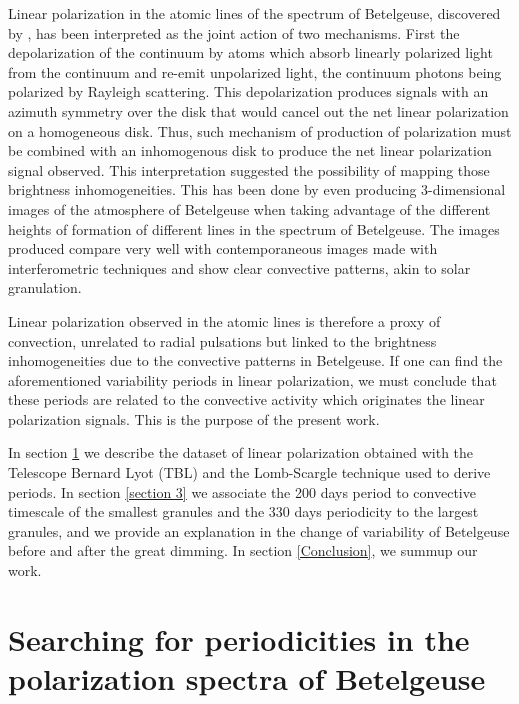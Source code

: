 \documentclass{aa}
\begin{document}
Linear polarization in the atomic lines of the spectrum of Betelgeuse, discovered by \cite{auriere_discovery_2016}, has been interpreted as the joint action of 
two mechanisms. First the depolarization of the continuum by atoms which absorb linearly polarized light from the continuum and re-emit unpolarized light, the 
continuum photons being polarized by Rayleigh scattering. This depolarization produces signals with an azimuth symmetry over the disk that 
would  cancel out the net linear polarization on a homogeneous disk. Thus, such mechanism of production of polarization must be combined with an inhomogenous disk to produce the net linear polarization 
signal observed. This interpretation suggested the possibility of mapping those brightness inhomogeneities. This has been done by \cite{lopez_ariste_convective_2018} 
even producing 3-dimensional images of the atmosphere of Betelgeuse \citep{lopez_ariste_three-dimensional_2022} when taking advantage of the different heights of formation of 
different lines in the spectrum of Betelgeuse. The images produced compare very well with contemporaneous images made with interferometric 
techniques \citep{montarges_close_2016} and show clear convective patterns, akin to solar granulation.

Linear polarization observed in the atomic lines is therefore a proxy of convection, unrelated to radial 
pulsations but linked to the brightness inhomogeneities due to the convective patterns in Betelgeuse. If one can find the 
aforementioned variability periods 
in linear polarization, we must conclude that these periods are related to the convective activity which originates the linear 
polarization signals.
This is the purpose of the present work. 

In section \ref{Section 2} we describe the dataset of linear polarization obtained with the Telescope Bernard Lyot (TBL) and the Lomb-Scargle technique used to derive periods. 
In section \ref{section 3} we associate the 200 days period to convective timescale of the smallest granules and the 330 days periodicity to the largest granules, and we provide an explanation in the change of variability of Betelgeuse before and after the great dimming. 
In section \ref{Conclusion}, we summup our work.


\section{Searching for periodicities in the polarization spectra of Betelgeuse}
\label{Section 2}
\end{document}
